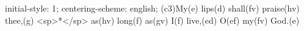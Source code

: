 initial-style: 1;
centering-scheme: english;
(c3)My(e) lips(d) shall(fv) praise(hv) thee,(g) <sp>*</sp> as(hv) long(f) as(gv) I(f) live,(ed) O(ef) my(fv) God.(e)
